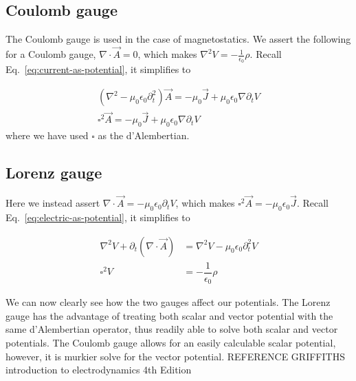 \subsection{Coulomb gauge}
The Coulomb gauge is used in the case of magnetostatics.
We assert the following for a Coulomb gauge, $\nabla \cdot \vec{A} = 0$, which makes $\nabla^2 V = -\tfrac{1}{\epsilon_0} \rho$.
Recall Eq.~\eqref{eq:current-as-potential}, it simplifies to

\begin{align}
  \left(\nabla^2 - \mu_0 \epsilon_0 \partial_t^2 \right) \vec{A} = -\mu_0 \vec{J} + \mu_0 \epsilon_0 \nabla \partial_t V \nonumber \\
  \square^2 \vec{A} = -\mu_0 \vec{J} + \mu_0 \epsilon_0 \nabla \partial_t V
\end{align}
where we have used $\square$ as the d'Alembertian.

\subsection{Lorenz gauge}
Here we instead assert $\nabla \cdot \vec{A} = -\mu_0 \epsilon_0 \partial_t V$, which makes $\square^2 \vec{A} = -\mu_0 \epsilon_0 \vec{J}$.
Recall Eq.~\eqref{eq:electric-as-potential}, it simplifies to

\begin{align}
  \nabla^2 V + \partial_t (\nabla \cdot \vec{A}) &= \nabla^2 V - \mu_0 \epsilon_0 \partial_t^2 V \nonumber \\
  \square^2 V &= -\dfrac{1}{\epsilon_0} \rho
\end{align}

We can now clearly see how the two gauges affect our potentials.
The Lorenz gauge has the advantage of treating both scalar and vector potential with the same d'Alembertian operator, thus readily able to solve both scalar and vector potentials.
The Coulomb gauge allows for an easily calculable scalar potential, however, it is murkier solve for the vector potential.
REFERENCE GRIFFITHS introduction to electrodynamics 4th Edition
